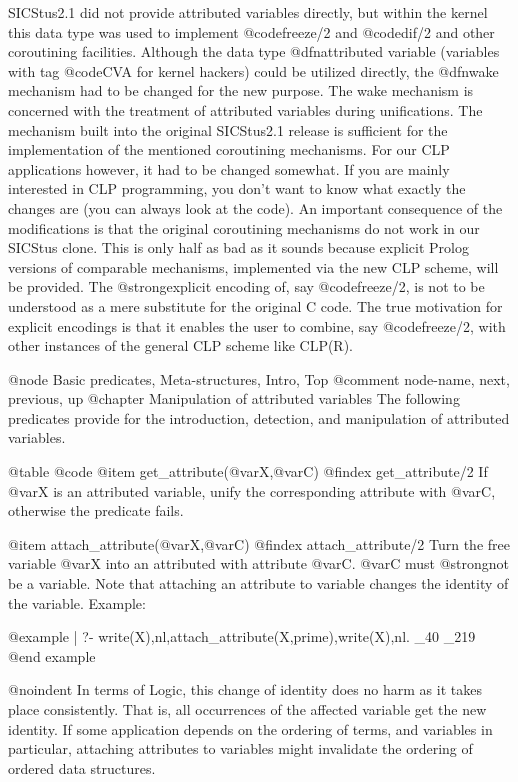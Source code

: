 SICStus2.1 did not provide attributed variables directly, but within the
kernel this data type was used to implement @code{freeze/2} and
@code{dif/2} and other coroutining facilities. Although the data type
@dfn{attributed variable} (variables with tag @code{CVA} for kernel
hackers) could be utilized directly, the @dfn{wake mechanism} had to be
changed for the new purpose. The wake mechanism is concerned with the
treatment of attributed variables during unifications. The mechanism
built into the original SICStus2.1 release is sufficient for the
implementation of the mentioned coroutining mechanisms. For our CLP
applications however, it had to be changed somewhat. If you are mainly
interested in CLP programming, you don't want to know what exactly the
changes are (you can always look at the code). An important consequence
of the modifications is that the original coroutining mechanisms do not
work in our SICStus clone. This is only half as bad as it sounds because
explicit Prolog versions of comparable mechanisms, implemented via the
new CLP scheme, will be provided.  The @strong{explicit} encoding of,
say @code{freeze/2}, is not to be understood as a mere substitute for
the original C code. The true motivation for explicit encodings is that
it enables the user to combine, say @code{freeze/2}, with other
instances of the general CLP scheme like CLP(R).

@node Basic predicates, Meta-structures, Intro, Top    
@comment  node-name,  next,  previous,  up
@chapter Manipulation of attributed variables
The following predicates provide for the introduction, detection, and
manipulation of attributed variables.

@table @code
@item get_attribute(@var{X},@var{C})
@findex get_attribute/2
If @var{X} is an attributed variable, unify the corresponding attribute 
with @var{C}, otherwise the predicate fails.


@item attach_attribute(@var{X},@var{C})
@findex attach_attribute/2
Turn the free variable @var{X} into an attributed with attribute @var{C}.
@var{C} must @strong{not} be a variable. Note that attaching an attribute
to variable changes the identity of the variable. Example:

@example
| ?- write(X),nl,attach_attribute(X,prime),write(X),nl.
_40
_219
@end example

@noindent
In terms of Logic, this change of identity does no harm as it takes place
consistently. That is, all occurrences of the affected variable get the new
identity. If some application depends on the ordering of terms, and variables
in particular, attaching attributes to variables might invalidate the ordering
of ordered data structures.


